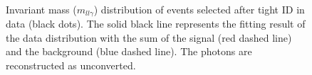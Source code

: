 \begin{figure}[htbp]
    \centering
	 \\
	\begin{tcolorbox}[colback=black!5!white,colframe=white!75!black]
    \caption{Invariant mass ($m_{ll\gamma}$) distribution of events selected after tight ID in data (black dots). The solid black line represents the fitting result of the data distribution with the sum of the signal (red dashed line) and the background (blue dashed line). The photons are reconstructed as unconverted.}
    \label{Eff:TemplateFit:UnC:After}
    \end{tcolorbox}
    
\end{figure}

